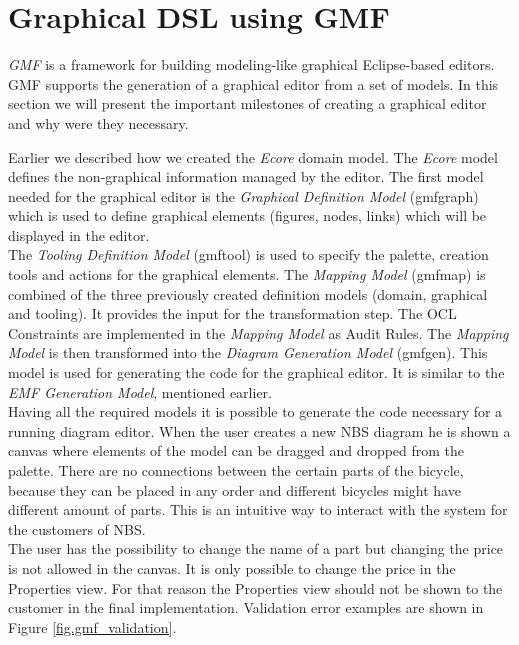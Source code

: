 \section{Graphical DSL using GMF}
\label{sec.gmf}

\noindent \emph{GMF} is a framework for
building modeling-like graphical Eclipse-based editors.
\cite{Article_Introducing_GMF} GMF supports the generation of a graphical editor
from a set of models. In this section we will present the important
milestones of creating a graphical editor and why were they necessary. 

\noindent Earlier we described how we created the \emph{Ecore} domain model. The
\emph{Ecore} model defines the non-graphical information managed by the editor. The first
model needed for the graphical editor is the \emph{Graphical Definition Model}
(gmfgraph) which is used to define graphical elements (figures, nodes, links)
which will be displayed in the editor. \\

\noindent The \emph{Tooling Definition Model} (gmftool)
is used to specify the palette, creation tools and actions for the
graphical elements. The \emph{Mapping Model} (gmfmap) is combined of the
three previously created definition models (domain, graphical and tooling).
It provides the input for the transformation step. The OCL Constraints are
implemented in the \emph{Mapping Model} as Audit Rules. The \emph{Mapping Model}
is then transformed into the \emph{Diagram Generation Model} (gmfgen). This
model is used for generating the code for the graphical editor. It is similar to
the \emph{EMF Generation Model}, mentioned earlier. \cite{GMF_Tutorial}\\

\noindent Having all the required models it is possible to generate the code
necessary for a running diagram editor. When the user creates a new NBS diagram he is
shown a canvas where elements of the model can be dragged and dropped from the
palette. There are no connections between the certain parts
of the bicycle, because they can be placed in any order and different bicycles
might have different amount of parts. This is an intuitive way to interact
with the system for the customers of NBS.\\

\noindent The user has the possibility to change the name of a part but changing
the price is not allowed in the canvas. It is only possible to change the
price in the Properties view. For that reason the Properties view should not be
shown to the customer in the final implementation.  
Validation error examples are shown in Figure \ref{fig.gmf_validation}.\\

